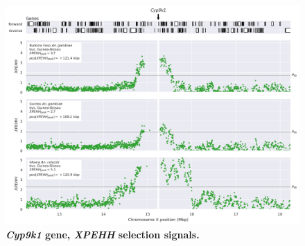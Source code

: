 \documentclass[a4paper,11pt,abstracton,hidelinks]{scrartcl}
\begin{document}
\clearpage


\begin{figure}[t!]
	\begin{center}
		\includegraphics*[width=1\linewidth,center]{artwork/locus_cyp9k1_xpehh_pdist.png}
	\end{center}
	\caption[\textit{Cyp9k1} gene, \textit{XPEHH} selection signals]{
	\textbf{\textit{Cyp9k1} gene, \textit{XPEHH} selection signals.}
	} 
	\label{fig:locus_cyp9k1_xpehh}
\end{figure}


\clearpage
\end{document}
